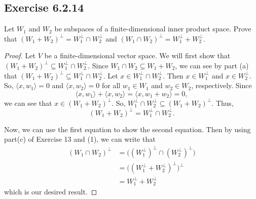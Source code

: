 \subsection*{Exercise 6.2.14} Let \( {W}_{1} \) and \( {W}_{2} \) be subspaces of a finite-dimensional inner product space. Prove that \( ({W}_{1} + {W}_{2})^{\perp} = {W}_{1}^{\perp} \cap {W}_{2}^{\perp} \) and \( ({W}_{1} \cap {W}_{2})^{\perp} = {W}_{1}^{\perp} + {W}_{2}^{\perp} \). 
\begin{proof}
    Let \( V \) be a finite-dimensional vector space. We will first show that \( ({W}_{1} + {W}_{2})^{\perp} \subseteq {W}_{1}^{\perp} \cap {W}_{2}^{\perp} \). Since \( {W}_{1} \cap {W}_{2} \subseteq {W}_{1} + {W}_{2} \), we can see by part (a) that \( ({W}_{1} + {W}_{2})^{\perp} \subseteq {W}_{1}^{\perp} \cap {W}_{2}^{\perp}  \). Let \( x \in {W}_{1}^{\perp} \cap {W}_{2}^{\perp} \). Then \( x \in {W}_{1}^{\perp} \) and  \( x \in {W}_{2}^{\perp} \). So, \( \langle x , {w}_{1}  \rangle = 0  \) and \( \langle x  ,  {w}_{2} \rangle = 0  \) for all \( {w}_{1} \in {W}_{1} \) and \( {w}_{2} \in {W}_{2} \), respectively. Since 
    \[  \langle x , {w}_{1} \rangle + \langle x  , {w}_{2} \rangle = \langle x  ,  {w}_{1} + {w}_{2} \rangle = 0, \]
    we can see that \( x \in ({W}_{1} + {W}_{2})^{\perp} \). So, \( {W}_{1}^{\perp} \cap {W}_{2}^{\perp} \subseteq ({W}_{1} + {W}_{2})^{\perp} \). Thus, 
    \[  ({W}_{1} + {W}_{2})^{\perp} = {W}_{1}^{\perp} \cap {W}_{2}^{\perp}. \tag{1} \]

    Now, we can use the first equation to show the second equation. Then by using part(c) of Exercise 13 and (1), we can write that
    \begin{align*}
        ({W}_{1} \cap {W}_{2})^{\perp} &= \Big( ({W}_{1}^{\perp})^{\perp} \cap ({W}_{2}^{\perp})^{\perp} \Big)  \\
                                       &= \Big( (W_{1}^{\perp} + {W}_{2}^{\perp})^{\perp}  \Big)^{\perp} \\
                                       &= {W}_{1}^{\perp} + {W}_{2}^{\perp}
    \end{align*}
    which is our desired result.


\end{proof}

